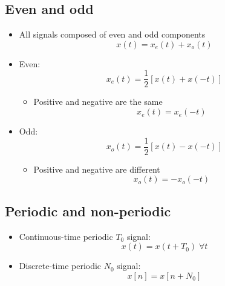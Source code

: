 \documentclass[conference]{IEEEtran}
\begin{document}
\subsection{Even and odd}

\begin{itemize}
  \item All signals composed of even and odd components
  $$
    x(t) = x_e(t) + x_o(t)
  $$

  \item Even:
  $$
    x_e(t) = \frac{1}{2}[x(t) + x(-t)]
  $$
  \begin{itemize}
    \item Positive and negative are the same
    $$
      x_e(t) = x_e(-t)
    $$
  \end{itemize}

  \item Odd:
  $$
    x_o(t) = \frac{1}{2}[x(t) - x(-t)]
  $$
  \begin{itemize}
    \item Positive and negative are different
    $$
      x_o(t) = -x_o(-t)
    $$
  \end{itemize}
\end{itemize}

\subsection{Periodic and non-periodic}

\begin{itemize}
  \item Continuous-time periodic $T_0$ signal:
  $$
    x(t) = x(t + T_0) \; \forall t
  $$

  \item Discrete-time periodic $N_0$ signal:
  $$
    x[n] = x[n + N_0]
  $$
  
\end{itemize}


\end{document}
